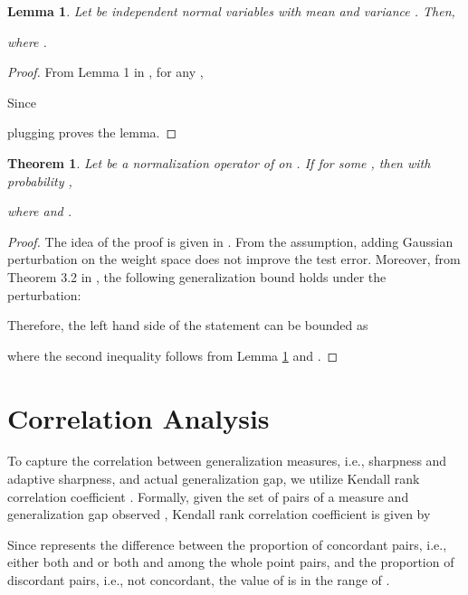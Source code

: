 \documentclass{article}
\newtheorem{thm}{Theorem}
\newtheorem{lem}{Lemma}
\begin{document}
\begin{lem}\label{concent}
Let  be independent normal variables with mean  and variance .
Then,

where .
\end{lem}
\begin{proof}
From Lemma 1 in \citet{laurent}, for any ,

Since

plugging  proves the lemma.

\end{proof}

\begin{thm}
Let  be a normalization operator of  on .
If  for some ,
then with probability , 
\ificml
    
\else
    
\fi
where  and .
\end{thm}
\begin{proof}
The idea of the proof is given in \citet{foret2021sharpnessaware}. From the assumption, adding Gaussian perturbation on the weight space does not improve the test error.
Moreover, from Theorem 3.2 in \citet{chatterji2019intriguing}, the following generalization bound holds under the perturbation:
\ificml
    
\else
    
\fi
Therefore, the left hand side of the statement can be bounded as
\ificml
    
\else
    
\fi
where the second inequality follows from Lemma \ref{concent} and  .

\end{proof}


\section{Correlation Analysis} \label{corrdetail}

To capture the correlation between generalization measures, i.e., sharpness and adaptive sharpness, and actual generalization gap, we utilize Kendall rank correlation coefficient \cite{kendall}. Formally, given the set of pairs of a measure and generalization gap observed , Kendall rank correlation coefficient  is given by

Since  represents the difference between the proportion of concordant pairs, i.e., either both  and  or both  and  among the whole  point pairs, and the proportion of discordant pairs, i.e., not concordant, the value of  is in the range of .
\end{document}
